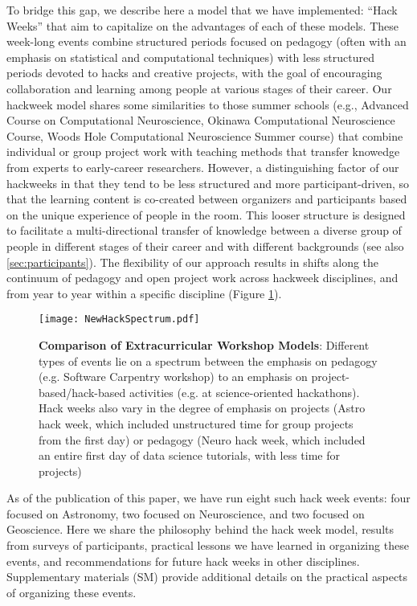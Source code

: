 To bridge this gap, we describe here a model that we have implemented: ``Hack Weeks'' that aim to capitalize on the advantages of each of these models.
These week-long events combine structured periods focused on pedagogy (often with an emphasis on statistical and computational techniques) with less structured periods devoted to hacks and creative projects, with the goal of encouraging collaboration and learning among people at various stages of their career. 
Our hackweek model shares some similarities to those summer schools (e.g., Advanced Course on Computational Neuroscience, Okinawa Computational Neuroscience Course, Woods Hole Computational Neuroscience Summer course) that combine individual or group project work with teaching methods that transfer knowedge from experts to early-career researchers.
However, a distinguishing factor of our hackweeks in that they tend to be less structured and more participant-driven, so that the learning content is co-created between organizers and participants based on the unique experience of people in the room. 
This looser structure is designed to facilitate a multi-directional transfer of knowledge between a diverse group of people in different stages of their career and with different backgrounds (see also \ref{sec:participants}). The flexibility of our approach results in shifts along the continuum of pedagogy and open project work across hackweek disciplines, and from year to year within a specific discipline (Figure \ref{fig:hackspectrum}).

\begin{figure}
\begin{center}
\texttt{[image: NewHackSpectrum.pdf]}
\caption{{\bf Comparison of Extracurricular Workshop Models}: Different types of events lie on a spectrum between the emphasis on pedagogy (e.g. Software Carpentry workshop) to an emphasis on project-based/hack-based activities (e.g. at science-oriented hackathons). Hack weeks also vary in the degree of emphasis on projects (Astro hack week, which included unstructured time for group projects from the first day) or pedagogy (Neuro hack week, which included an entire first day of data science tutorials, with less time for projects)}
\label{fig:hackspectrum}
\end{center}
\end{figure}

As of the publication of this paper, we have run eight such hack week events: four focused on Astronomy, two focused on Neuroscience, and two focused on Geoscience.
Here we share the philosophy behind the hack week model, results from surveys of participants, practical lessons we have learned in organizing these events, and recommendations for future hack weeks in other disciplines. Supplementary materials (SM) provide additional details on the practical aspects of organizing these events.
